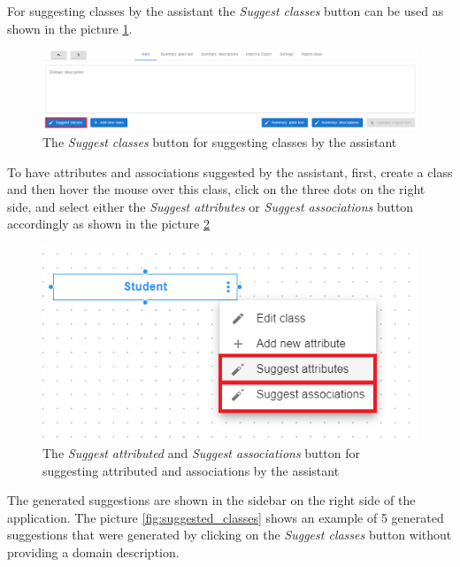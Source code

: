 For suggesting classes by the assistant the \textit{Suggest classes} button can be used as shown in the picture \ref{fig:suggest_classes}.

\begin{figure}[!h]
    \includegraphics[scale=0.36]{../docs/images/frontend/suggest-classes.png}
    \caption{\centering The \textit{Suggest classes} button for suggesting classes by the assistant}
    \label{fig:suggest_classes}
\end{figure}

To have attributes and associations suggested by the assistant, first, create a class and then hover the mouse over this class, click on the three dots on the right side, and select either the \textit{Suggest attributes} or \textit{Suggest associations} button accordingly as shown in the picture \ref{fig:suggest_attributes}

\begin{figure}[!h]
    \includegraphics[scale=0.45]{../docs/images/frontend/suggest-attributes.png}
    \caption{\centering The \textit{Suggest attributed} and \textit{Suggest associations} button for suggesting attributed and associations by the assistant}
    \label{fig:suggest_attributes}
\end{figure}

The generated suggestions are shown in the sidebar on the right side of the application. The picture \ref{fig:suggested_classes} shows an example of 5 generated suggestions that were generated by clicking on the \textit{Suggest classes} button without providing a domain description.

